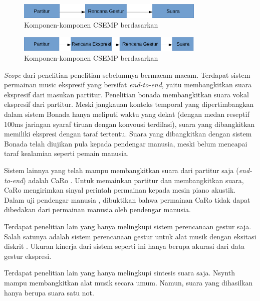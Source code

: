 \begin{figure}[h]
    \centering
    \includegraphics[width=0.8\textwidth]{resources/CSEMP-Components-Thippur.eps}
    \caption{Komponen-komponen CSEMP berdasarkan \citet{Thippur2013ProbabilisticMO}} \label{thippurcomponents}
\end{figure}

\begin{figure}[h]
    \centering
    \includegraphics[width=0.8\textwidth]{resources/CSEMP-Components-Yu.eps}
    \caption{Komponen-komponen CSEMP berdasarkan \citet{yu2017bowing}}\label{yucomponents}
\end{figure}

\textit{Scope} dari penelitian-penelitian sebelumnya bermacam-macam. Terdapat sistem permainan music ekspresif yang bersifat \textit{end-to-end}, yaitu membangkitkan suara ekspresif dari masukan partitur. Penelitian bonada \parencite{bonada2017singing} membangkitkan suara vokal ekspresif dari partitur. Meski jangkauan konteks temporal yang dipertimbangkan dalam sistem Bonada hanya meliputi waktu yang dekat (dengan medan reseptif 100ms jaringan syaraf tiruan dengan konvousi terdilasi), suara yang dibangkitkan memiliki ekspresi dengan taraf tertentu. Suara yang dibangkitkan dengan sistem Bonada telah diujikan pula kepada pendengar manusia, meski belum mencapai taraf kealamian seperti pemain manusia.

Sistem lainnya yang telah mampu membangkitkan suara dari partitur saja (\textit{end-to-end}) adalah CaRo \parencite{canazza2015}. Untuk memainkan partitur dan membangkitkan suara, CaRo mengirimkan sinyal perintah permainan kepada mesin piano akustik. Dalam uji pendengar manusia \parencite{schubert2017test}, dibuktikan bahwa permainan CaRo tidak dapat dibedakan dari permainan manusia oleh pendengar manusia.

Terdapat penelitian lain yang hanya melingkupi sistem perencanaan gestur saja. Salah satunya adalah sistem perencanaan gestur untuk alat musik dengan eksitasi diskrit \parencite{miranda2010}. Ukuran kinerja dari sistem seperti ini hanya berupa akurasi dari data gestur ekspresi.

Terdapat penelitian lain yang hanya melingkupi sintesis suara saja. Nsynth \parencite{nsynth2017} mampu membangkitkan alat musik secara umum. Namun, suara yang dihasilkan hanya berupa suara satu not.


